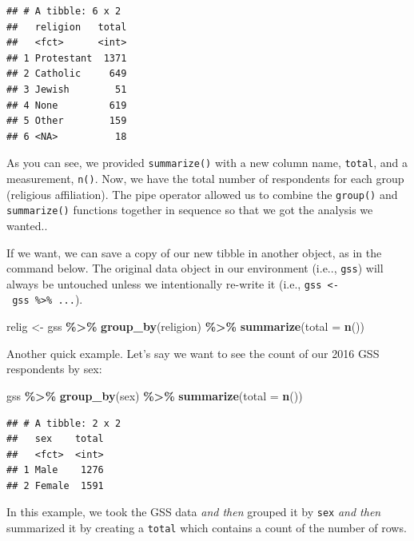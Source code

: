 \documentclass[
]{book}
\newenvironment{Shaded}{\begin{snugshade}}{\end{snugshade}}
\newcommand{\AttributeTok}[1]{\textcolor[rgb]{0.13,0.29,0.53}{#1}}
\newcommand{\FunctionTok}[1]{\textcolor[rgb]{0.13,0.29,0.53}{\textbf{#1}}}
\newcommand{\NormalTok}[1]{#1}
\newcommand{\OtherTok}[1]{\textcolor[rgb]{0.56,0.35,0.01}{#1}}
\newcommand{\SpecialCharTok}[1]{\textcolor[rgb]{0.81,0.36,0.00}{\textbf{#1}}}
\begin{document}
\begin{verbatim}
## # A tibble: 6 x 2
##   religion   total
##   <fct>      <int>
## 1 Protestant  1371
## 2 Catholic     649
## 3 Jewish        51
## 4 None         619
## 5 Other        159
## 6 <NA>          18
\end{verbatim}

As you can see, we provided \texttt{summarize()} with a new column name, \texttt{total}, and a measurement, \texttt{n()}. Now, we have the total number of respondents for each group (religious affiliation). The pipe operator allowed us to combine the \texttt{group()} and \texttt{summarize()} functions together in sequence so that we got the analysis we wanted..

If we want, we can save a copy of our new tibble in another object, as in the command below. The original data object in our environment (i.e.., \texttt{gss}) will always be untouched unless we intentionally re-write it (i.e., \texttt{gss\ \textless{}-\ gss\ \%\textgreater{}\%\ ...}).

\begin{Shaded}
\begin{Highlighting}[]
\NormalTok{relig }\OtherTok{\textless{}{-}}\NormalTok{ gss }\SpecialCharTok{\%\textgreater{}\%}
  \FunctionTok{group\_by}\NormalTok{(religion) }\SpecialCharTok{\%\textgreater{}\%}
  \FunctionTok{summarize}\NormalTok{(}\AttributeTok{total =} \FunctionTok{n}\NormalTok{())}
\end{Highlighting}
\end{Shaded}

Another quick example. Let's say we want to see the count of our 2016 GSS respondents by sex:

\begin{Shaded}
\begin{Highlighting}[]
\NormalTok{gss }\SpecialCharTok{\%\textgreater{}\%}
  \FunctionTok{group\_by}\NormalTok{(sex) }\SpecialCharTok{\%\textgreater{}\%}
  \FunctionTok{summarize}\NormalTok{(}\AttributeTok{total =} \FunctionTok{n}\NormalTok{())}
\end{Highlighting}
\end{Shaded}

\begin{verbatim}
## # A tibble: 2 x 2
##   sex    total
##   <fct>  <int>
## 1 Male    1276
## 2 Female  1591
\end{verbatim}

In this example, we took the GSS data \emph{and then} grouped it by \texttt{sex} \emph{and then} summarized it by creating a \texttt{total} which contains a count of the number of rows.
\end{document}
